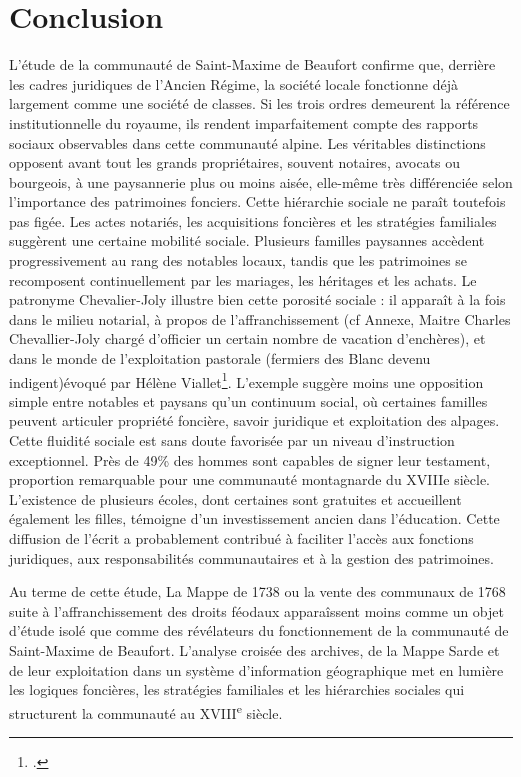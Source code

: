 \documentclass[12pt,a4paper]{report}
\begin{document}
\chapter*{Conclusion}

L'étude de la communauté de Saint-Maxime de Beaufort confirme que, derrière les cadres juridiques de l'Ancien Régime, la société locale fonctionne déjà largement comme une société de classes. Si les trois ordres demeurent la référence institutionnelle du royaume, ils rendent imparfaitement compte des rapports sociaux observables dans cette communauté alpine. Les véritables distinctions opposent avant tout les grands propriétaires, souvent notaires, avocats ou bourgeois, à une paysannerie plus ou moins aisée, elle-même très différenciée selon l'importance des patrimoines fonciers.
Cette hiérarchie sociale ne paraît toutefois pas figée. Les actes notariés, les acquisitions foncières et les stratégies familiales suggèrent une certaine mobilité sociale. Plusieurs familles paysannes accèdent progressivement au rang des notables locaux, tandis que les patrimoines se recomposent continuellement par les mariages, les héritages et les achats.
Le patronyme Chevalier-Joly illustre bien cette porosité sociale : il apparaît à la fois dans le milieu notarial, à propos de l’affranchissement (cf Annexe, Maitre Charles Chevallier-Joly chargé d'officier un certain nombre de vacation d'enchères), et dans le monde de l’exploitation pastorale (fermiers des Blanc devenu indigent)évoqué par Hélène Viallet\footcite[264]{iallet1990Blanc}. L’exemple suggère moins une opposition simple entre notables et paysans qu’un continuum social, où certaines familles peuvent articuler propriété foncière, savoir juridique et exploitation des alpages.
Cette fluidité sociale est sans doute favorisée par un niveau d'instruction exceptionnel. Près de 49\% des hommes sont capables de signer leur testament, proportion remarquable pour une communauté montagnarde du XVIIIe siècle. L'existence de plusieurs écoles, dont certaines sont gratuites et accueillent également les filles, témoigne d'un investissement ancien dans l'éducation. Cette diffusion de l'écrit a probablement contribué à faciliter l'accès aux fonctions juridiques, aux responsabilités communautaires et à la gestion des patrimoines.



Au terme de cette étude, La Mappe de 1738 ou la vente des communaux de 1768 suite à l'affranchissement des droits féodaux apparaîssent moins comme un objet d'étude isolé que comme des révélateurs du fonctionnement de la communauté de Saint-Maxime de Beaufort. L'analyse croisée des archives, de la Mappe Sarde et de leur exploitation dans un système d'information géographique met en lumière les logiques foncières, les stratégies familiales et les hiérarchies sociales qui structurent la communauté au XVIII\textsuperscript{e} siècle.
\end{document}
